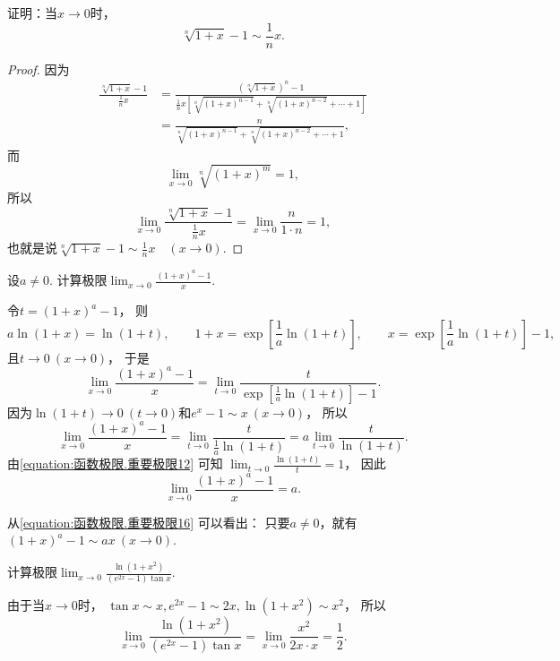 \begin{example}
证明：当\(x\to0\)时，\begin{equation}
	\sqrt[n]{1+x} - 1 \sim \frac1n x.
\end{equation}
\begin{proof}
因为\begin{align*}
	\frac{\sqrt[n]{1+x} - 1}{\frac1n x}
	&= \frac{(\sqrt[n]{1+x})^n - 1}{\frac1n x \left[ \sqrt[n]{(1+x)^{n-1}} + \sqrt[n]{(1+x)^{n-2}} + \dotsb + 1 \right]} \\
	&= \frac{n}{\sqrt[n]{(1+x)^{n-1}} + \sqrt[n]{(1+x)^{n-2}} + \dotsb + 1},
\end{align*}
而\[
	\lim_{x\to0} \sqrt[n]{(1+x)^m} = 1,
\]
所以\[
	\lim_{x\to0} \frac{\sqrt[n]{1+x} - 1}{\frac1n x} = \lim_{x\to0} \frac{n}{1 \cdot n} = 1,
\]
也就是说\(\sqrt[n]{1+x} - 1 \sim \frac1n x \quad(x\to0)\).
\end{proof}
\end{example}

\begin{example}
设\(a\neq0\).
计算极限\(\lim_{x\to0} \frac{(1+x)^a-1}x\).
\begin{solution}
令\(t = (1+x)^a-1\)，
则\[
	a \ln(1+x) = \ln(1+t),
	\qquad
	1+x=\exp[\frac1a \ln(1+t)],
	\qquad
	x=\exp[\frac1a \ln(1+t)]-1,
\]
且\(t\to0\ (x\to0)\)，
于是\[
	\lim_{x\to0} \frac{(1+x)^a-1}x
	= \lim_{t\to0} \frac{t}{\exp[\frac1a \ln(1+t)]-1}.
\]
因为\(\ln(1+t)\to0\ (t\to0)\)和\(e^x-1 \sim x\ (x\to0)\)，
所以\[
	\lim_{x\to0} \frac{(1+x)^a-1}x
	= \lim_{t\to0} \frac{t}{\frac1a \ln(1+t)}
	= a \lim_{t\to0} \frac{t}{\ln(1+t)}.
\]
由\cref{equation:函数极限.重要极限12} 可知
\(\lim_{t\to0} \frac{\ln(1+t)}{t} = 1\)，
因此\begin{equation}\label{equation:函数极限.重要极限16}
	\lim_{x\to0} \frac{(1+x)^a-1}x
	= a.
\end{equation}
\end{solution}
\end{example}
\begin{remark}
从\cref{equation:函数极限.重要极限16} 可以看出：
只要\(a\neq0\)，就有\((1+x)^a-1 \sim ax\ (x\to0)\).
\end{remark}

\begin{example}
计算极限\(\lim_{x\to0} \frac{\ln(1+x^2)}{(e^{2x}-1) \tan x}\).
\begin{solution}
由于当\(x\to0\)时，
\(\tan x \sim x,
e^{2x}-1 \sim 2x,
\ln(1+x^2) \sim x^2\)，
所以\[
	\lim_{x\to0} \frac{\ln(1+x^2)}{(e^{2x}-1) \tan x}
	= \lim_{x\to0} \frac{x^2}{2x \cdot x}
	= \frac12.
\]
\end{solution}
\end{example}

